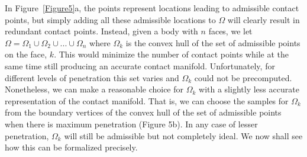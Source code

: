 \documentclass[9pt,twocolumn]{article}
\begin{document}
In Figure~\ref{Figure5}a, the points represent locations leading to admissible contact points, but simply adding all these admissible locations to $\Omega$ will clearly result in redundant contact points. Instead, given a body with $n$ faces, we let $\Omega = \Omega_1 \cup \Omega_2 \cup ... \cup \Omega_n$ where $\Omega_k$ is the convex hull of the set of admissible points on the face, $k$. This would minimize the number of contact points while at the same time still producing an accurate contact manifold. Unfortunately, for different levels of penetration this set varies and $\Omega_k$ could not be precomputed. Nonetheless, we can make a reasonable choice for $\Omega_k$ with a slightly less accurate representation of the contact manifold. That is, we can choose the samples for $\Omega_k$ from the boundary vertices of the convex hull of the set of admissible points when there is maximum penetration (Figure 5b). In any case of lesser penetration, $\Omega_k$ will still be admissible but not completely ideal. We now shall see how this can be formalized precisely. \newline
\end{document}
